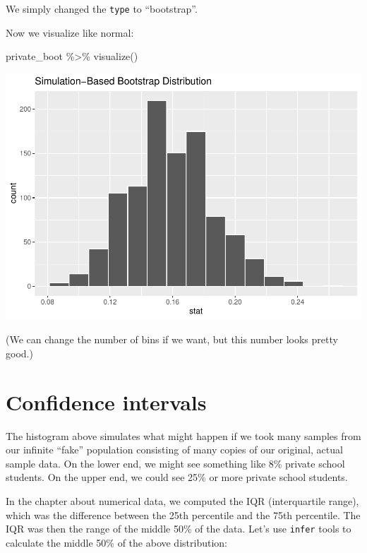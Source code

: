 \documentclass[
]{book}
\newenvironment{Shaded}{\begin{snugshade}}{\end{snugshade}}
\newcommand{\FunctionTok}[1]{\textcolor[rgb]{0.00,0.00,0.00}{#1}}
\newcommand{\NormalTok}[1]{#1}
\newcommand{\SpecialCharTok}[1]{\textcolor[rgb]{0.00,0.00,0.00}{#1}}
\begin{document}
We simply changed the \texttt{type} to ``bootstrap''.

Now we visualize like normal:

\begin{Shaded}
\begin{Highlighting}[]
\NormalTok{private\_boot }\SpecialCharTok{\%\textgreater{}\%}
    \FunctionTok{visualize}\NormalTok{()}
\end{Highlighting}
\end{Shaded}

\includegraphics{intro_stats_files/figure-latex/unnamed-chunk-321-1.pdf}

(We can change the number of bins if we want, but this number looks pretty good.)

\hypertarget{ci-ci}{%
\section{Confidence intervals}\label{ci-ci}}

The histogram above simulates what might happen if we took many samples from our infinite ``fake'' population consisting of many copies of our original, actual sample data. On the lower end, we might see something like 8\% private school students. On the upper end, we could see 25\% or more private school students.

In the chapter about numerical data, we computed the IQR (interquartile range), which was the difference between the 25th percentile and the 75th percentile. The IQR was then the range of the middle 50\% of the data. Let's use \texttt{infer} tools to calculate the middle 50\% of the above distribution:
\end{document}
